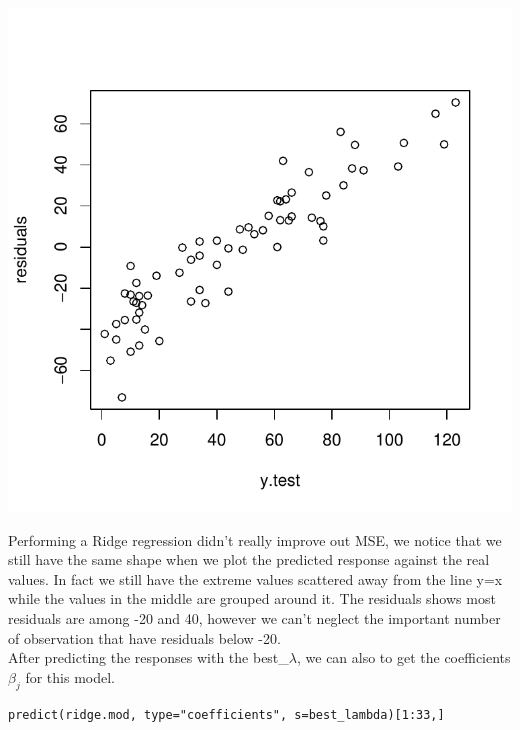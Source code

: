 \documentclass[]{report}
\begin{document}
\begin{center}
	\includegraphics[width=0.8\linewidth]{Figures/ridge_resid.pdf}
	\label{fig:ridge_resid}
\end{center}

Performing a Ridge regression didn't really improve out MSE, we notice that we still have the same shape when we plot the predicted response against the real values. In fact we still have the extreme values scattered away from the line y=x while the values in the middle are grouped around it. The residuals shows most residuals are among -20 and 40, however we can't neglect the important number of observation that have residuals below -20.\\

After predicting the responses with the best\_$\lambda$,  we can also to get the coefficients $\beta_{j}$ for this model.

\begin{lstlisting}
predict(ridge.mod, type="coefficients", s=best_lambda)[1:33,]
\end{lstlisting}
\end{document}
